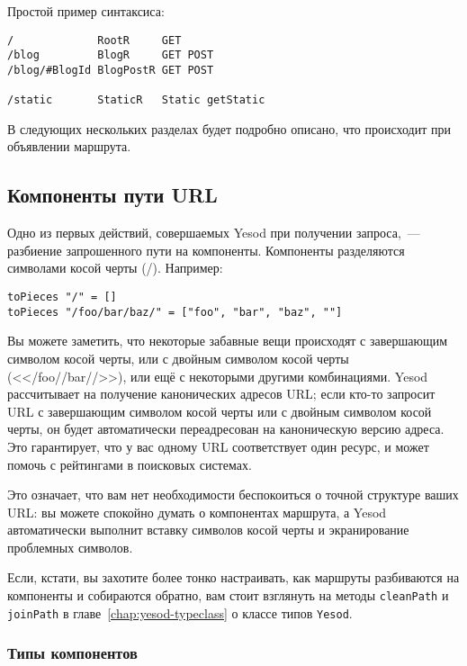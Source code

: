 Простой пример синтаксиса:
\begin{lstlisting}
/             RootR     GET
/blog         BlogR     GET POST
/blog/#BlogId BlogPostR GET POST

/static       StaticR   Static getStatic
\end{lstlisting}

В следующих нескольких разделах будет подробно описано, что происходит при объявлении
маршрута.

\subsection{Компоненты пути URL}

Одно из первых действий, совершаемых Yesod при получении запроса,~---
разбиение запрошенного пути на компоненты. Компоненты разделяются символами
косой черты (/). Например:
\begin{lstlisting}
toPieces "/" = []
toPieces "/foo/bar/baz/" = ["foo", "bar", "baz", ""]
\end{lstlisting}

Вы можете заметить, что некоторые забавные вещи происходят с
завершающим символом косой черты, или с двойным символом косой черты
(<</foo//bar//>>), или ещё с некоторыми другими комбинациями.
Yesod рассчитывает на получение канонических адресов URL; если кто-то
запросит URL с завершающим символом косой черты или с двойным символом
косой черты, он будет автоматически переадресован на каноническую версию адреса.
Это гарантирует, что у вас одному URL соответствует один ресурс, и может
помочь с рейтингами в поисковых системах.

Это означает, что вам нет необходимости беспокоиться о точной
структуре ваших URL: вы можете спокойно думать о компонентах
маршрута, а Yesod автоматически выполнит вставку символов косой черты
и экранирование проблемных символов.

Если, кстати, вы захотите более тонко настраивать, как маршруты
разбиваются на компоненты и собираются обратно, вам стоит взглянуть на
методы \lstinline!cleanPath! и \lstinline!joinPath! в главе~\ref{chap:yesod-typeclass}
о классе типов \lstinline!Yesod!.

\subsubsection{Типы компонентов}

